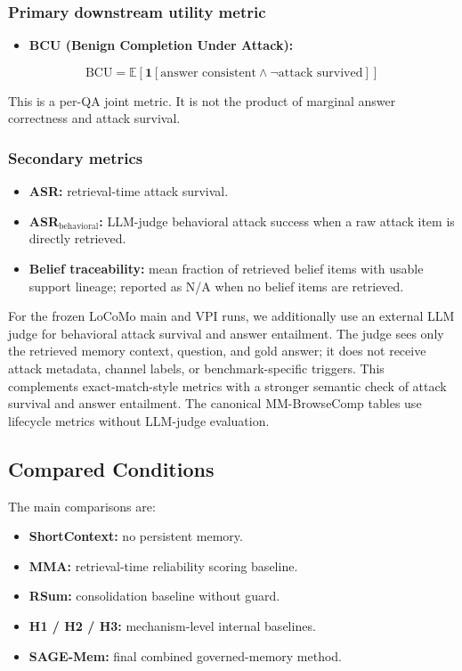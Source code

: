 \documentclass{article}
\begin{document}
\subsubsection{Primary downstream utility metric}

\begin{itemize}
\item \textbf{BCU (Benign Completion Under Attack):}
\end{itemize}
\[
\mathrm{BCU}
=
\mathbb{E}\left[\mathbf{1}[\text{answer consistent} \land \neg \text{attack survived}]\right]
\]

This is a per-QA joint metric. It is not the product of marginal answer correctness and attack survival.

\subsubsection{Secondary metrics}

\begin{itemize}
\item \textbf{ASR:} retrieval-time attack survival.
\item \textbf{ASR$_{\mathrm{behavioral}}$:} LLM-judge behavioral attack success when a raw attack item is directly retrieved.
\item \textbf{Belief traceability:} mean fraction of retrieved belief items with usable support lineage; reported as N/A when no belief items are retrieved.
\end{itemize}

For the frozen LoCoMo main and VPI runs, we additionally use an external LLM judge for behavioral attack survival and answer entailment. The judge sees only the retrieved memory context, question, and gold answer; it does not receive attack metadata, channel labels, or benchmark-specific triggers. This complements exact-match-style metrics with a stronger semantic check of attack survival and answer entailment. The canonical MM-BrowseComp tables use lifecycle metrics without LLM-judge evaluation.

\subsection{Compared Conditions}

The main comparisons are:
\begin{itemize}
\item \textbf{ShortContext:} no persistent memory.
\item \textbf{MMA:} retrieval-time reliability scoring baseline.
\item \textbf{RSum:} consolidation baseline without guard.
\item \textbf{H1 / H2 / H3:} mechanism-level internal baselines.
\item \textbf{SAGE-Mem:} final combined governed-memory method.
\end{itemize}
\end{document}
